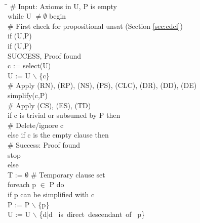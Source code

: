 \documentclass{report}
\begin{document}
\begin{figure}[hp]
  \begin{center}
    \tt
    \begin{tabbing}
      \quad\quad \= \quad\quad \= \quad\quad \=  \quad\quad \= \quad\quad \= \kill
      \# Input: Axioms in U, P is empty\\
      while U $\not= \emptyset{}$ begin\+\\
         \# First check for propositional unsat (Section \ref{sec:cdcl})\\
         if (U,P)\+\\
            if (U,P)\+\\
                 SUCCESS, Proof found\-\-\\
        c := select(U)\\
        U := U $\backslash$ \{c\}\\

        \# Apply (RN), (RP), (NS), (PS), (CLC), (DR), (DD), (DE)\\
        simplify(c,P)\\
        \# Apply (CS), (ES), (TD)\\
        if c is trivial or subsumed by P then\+\\
          \# Delete/ignore c\-\\
        else if c is the empty clause then\+\\
          \# Success: Proof found\\
          stop\-\\
        else\+\\
          T := $\emptyset{}$ \# Temporary clause set\\
          foreach p $\in$ P do\+\\
            if p can be simplified with c \+\\
              P := P $\backslash$ \{p\}\\
              U := U $\backslash$ \{d|d \mbox{ is direct descendant of } p\}\\


\end{tabbing}
\end{center}
\end{figure}
\end{document}
